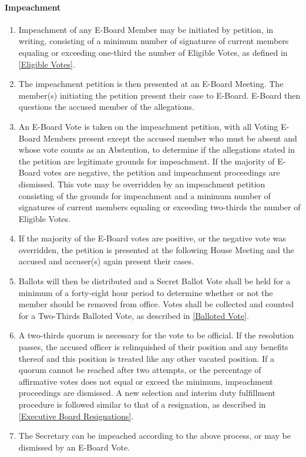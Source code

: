 \documentclass{article}
\newcommand{\asubsubsection}[1]{\paragraph{#1} \label{#1}}
\begin{document}
\asubsubsection{Impeachment}
\begin{enumerate}
	\item Impeachment of any E-Board Member may be initiated by petition, in writing, consisting of a minimum number of signatures of current members equaling or exceeding one-third the number of Eligible Votes, as defined in \ref{Eligible Votes}.
	\item The impeachment petition is then presented at an E-Board Meeting.
	      The member(s) initiating the petition present their case to E-Board.
	      E-Board then questions the accused member of the allegations.
	\item An E-Board Vote is taken on the impeachment petition, with all Voting E-Board Members present except the accused member who must be absent and whose vote counts as an Abstention, to determine if the allegations stated in the petition are legitimate grounds for impeachment.
	      If the majority of E-Board votes are negative, the petition and impeachment proceedings are dismissed.
	      This vote may be overridden by an impeachment petition consisting of the grounds for impeachment and a minimum number of signatures of current members equaling or exceeding two-thirds the number of Eligible Votes.
	\item If the majority of the E-Board votes are positive, or the negative vote was overridden, the petition is presented at the following House Meeting and the accused and accuser(s) again present their cases.
	\item Ballots will then be distributed and a Secret Ballot Vote shall be held for a minimum of a forty-eight hour period to determine whether or not the member should be removed from office.
	      Votes shall be collected and counted for a Two-Thirds Balloted Vote, as described in \ref{Balloted Vote}.
	\item A two-thirds quorum is necessary for the vote to be official.
	      If the resolution passes, the accused officer is relinquished of their position and any benefits thereof and this position is treated like any other vacated position.
	      If a quorum cannot be reached after two attempts, or the percentage of affirmative votes does not equal or exceed the minimum, impeachment proceedings are dismissed.
	      A new selection and interim duty fulfillment procedure is followed similar to that of a resignation, as described in \ref{Executive Board Resignations}.
	\item The Secretary can be impeached according to the above process, or may be dismissed by an E-Board Vote.
\end{enumerate}
\end{document}
